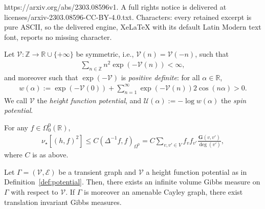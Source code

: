 \documentclass[10pt,a4paper]{amsart}
\newcommand{\Green}{\ensuremath{\mathbf{G}}}
\newcommand{\exact}{\star}
\renewcommand{\c}[1]{\ensuremath{\mathcal{#1}}}
\begin{document}
https://arxiv.org/abs/2303.08596v1. A full rights notice is delivered at licenses/arxiv-2303.08596-CC-BY-4.0.txt. Characters: every retained excerpt is pure ASCII, so the delivered engine, XeLaTeX with its default Latin Modern text font, reports no missing character.
\begin{definition} \label{def:potential}
Let $\mathcal V: \mathbb Z\to \mathbb R \cup \{ +\infty\}$ be symmetric, i.e., $\mathcal V (n)=\mathcal V(-n)$, such that 
\begin{align} \label{eq:Vsum}
\sum_{n\in \mathbb Z}n^2 \exp(-\mathcal V(n))<\infty,
\end{align}
and moreover such that $\exp(-\mathcal V)$
is \emph{positive definite}: for all $\alpha\in \mathbb R$, 
\begin{align}\label{eq:posdef}
	w(\alpha):=\exp(-\mathcal V(0))+\sum_{n=1}^{\infty}\exp(-\mathcal V(n))2\cos( n\alpha) > 0.
\end{align}
We call $\mathcal V$ the \emph{height function potential}, and $\mathcal U (\alpha) := -\log w(\alpha)$ the \emph{spin potential}.
\end{definition}

\begin{corollary}\label{cor:upper}
	For any $f\in \Omega^0_0(\mathbb R)$,
	\begin{align*}
		\nu_{\exact}[(h, f)^2] \leq  C  ( \Delta^{-1}f,f)_{\Omega^0}=C\sum_{v,v'\in V} f_vf_{v'}\frac{\Green(v, v')}{\deg(v')},
	\end{align*}
	where $C$ is as above.
\end{corollary}

\begin{theorem} \label{thm:extransinv}
	Let $\Gamma = (\mathscr V,\mathscr E)$ be a transient graph and $\c{V}$ a height function potential as in Definition~\ref{def:potential}. 
	Then, there exists an infinite volume Gibbs measure on $\Gamma$ with respect to $\mathcal V$. If $\Gamma$ is moreover an amenable Cayley graph, 
	there exist translation invariant Gibbs measures. 
\end{theorem}
\end{document}

